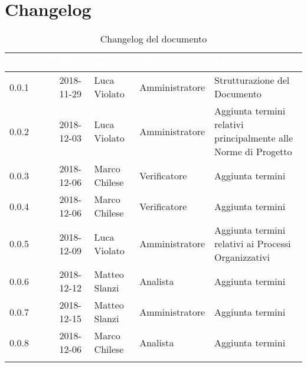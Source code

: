 \section{Changelog}

\begin{center}
\begin{longtable}[c]{|m{}|m{}|m{}|m{}|p{}|}
\hline
\rowcolor{bluelogo}\textbf{\textcolor{white}{Versione}} & \textbf{\textcolor{white}{Data}} & \textbf{\textcolor{white}{Autore}} & \textbf{\textcolor{white}{Ruolo}} & \textbf{\textcolor{white}{Descrizione}} \\
\hline \hline
\endfirsthead
0.0.1 & 2018-11-29 & Luca Violato & Amministratore & Strutturazione del Documento \\
\hline
\rowcolor{grigio}0.0.2 & 2018-12-03 & Luca Violato & Amministratore & Aggiunta termini relativi principalmente alle Norme di Progetto \\
\hline
0.0.3 & 2018-12-06 & Marco Chilese & Verificatore & Aggiunta termini\\
\hline 
\rowcolor{grigio}0.0.4 & 2018-12-06 & Marco Chilese & Verificatore & Aggiunta termini\\
\hline
0.0.5 & 2018-12-09 & Luca Violato & Amministratore & Aggiunta termini relativi ai Processi Organizzativi\\
\hline
\rowcolor{grigio}0.0.6 & 2018-12-12 & Matteo Slanzi & Analista & Aggiunta termini\\
\hline
0.0.7 & 2018-12-15 & Matteo Slanzi & Amministratore & Aggiunta termini\\
\hline
\rowcolor{grigio}0.0.8 & 2018-12-06 & Marco Chilese & Analista & Aggiunta termini\\
\hline
\caption{Changelog del documento}
\end{longtable}
\end{center}